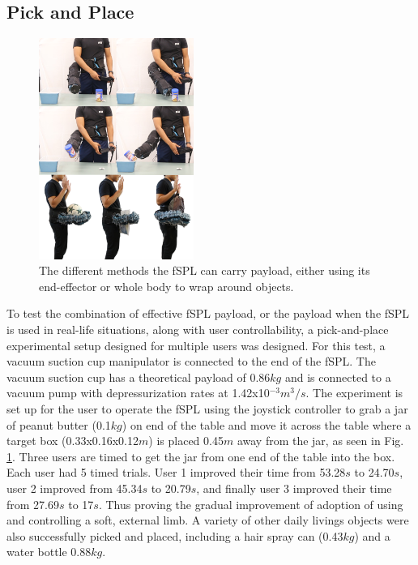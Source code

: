 \documentclass[letterpaper, 10 pt, conference]{ieeeconf}  %
\begin{document}
\subsection{Pick and Place}



\begin{figure}[b!]
\centering
\includegraphics[width=0.45\textwidth]{Figures/pick_place_whole_body}
\caption{The different methods the fSPL can carry payload, either using its end-effector or whole body to wrap around objects.}
\label{fig:pick_place_whole_body}
\vspace{-1.5em}
\end{figure}

To test the combination of effective fSPL payload, or the payload when the fSPL is used in real-life situations, along with user controllability, a pick-and-place experimental setup designed for multiple users was designed. For this test, a vacuum suction cup manipulator is connected to the end of the fSPL. The vacuum suction cup has a theoretical payload of 0.86$kg$ and is connected to a vacuum pump with depressurization rates at 1.42x10$^{-3}m^3/s$. The experiment is set up for the user to operate the fSPL using the joystick controller to grab a jar of peanut butter (0.1$kg$) on end of the table and move it across the table where a target box (0.33x0.16x0.12$m$) is placed 0.45$m$ away from the jar, as seen in Fig. \ref{fig:pick_place_whole_body}. Three users are timed to get the jar from one end of the table into the box. Each user had 5 timed trials. User 1 improved their time from 53.28$s$ to 24.70$s$, user 2 improved from 45.34$s$ to 20.79$s$, and finally user 3 improved their time from 27.69$s$ to 17$s$. Thus proving the gradual improvement of adoption of using and controlling a soft, external limb. A variety of other daily livings objects were also successfully picked and placed, including a hair spray can (0.43$kg$) and a water bottle 0.88$kg$.
\end{document}
